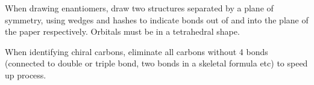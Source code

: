 \documentclass[../main]{subfiles}
\begin{document}
	When drawing enantiomers, draw two structures separated by a plane of symmetry, using wedges and hashes to indicate bonds out of and into the plane of the paper respectively. Orbitals must be in a tetrahedral shape.


	When identifying chiral carbons, eliminate all carbons without 4 bonds (connected to double or triple bond, two bonds in a skeletal formula etc) to speed up process.

\end{document}
